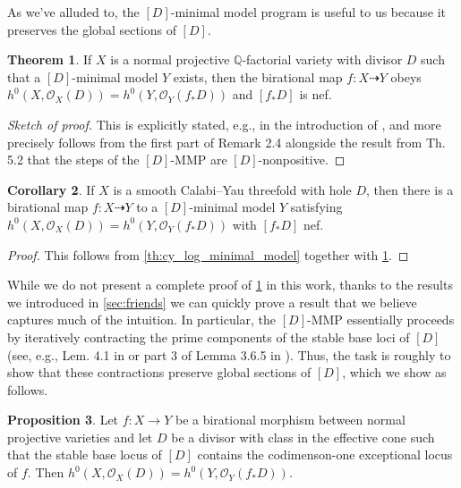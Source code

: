 \documentclass[11pt,dvipsnames]{article}
\theoremstyle{definition}
\newtheorem{theorem}{Theorem}
\newtheorem{prop}[theorem]{Proposition}
\newtheorem{corollary}[theorem]{Corollary}
\begin{document}
As we've alluded to, the $[D]$-minimal model program is useful to us because it preserves the global sections of $[D]$.
\begin{theorem}
    \label{th:MMP_global_sections}
    If $X$ is a normal projective $\mathbb{Q}$-factorial variety with divisor $D$ such that a $[D]$-minimal model $Y$ exists, then the birational map $f : X \dashrightarrow Y$ obeys $h^0(X, \mathcal{O}_X(D)) = h^0(Y, \mathcal{O}_Y(f_* D))$ and $[f_* D]$ is nef.
\end{theorem}
\begin{proof}[Sketch of proof]
    This is explicitly stated, e.g., in the introduction of \cite{kaloghiros2016finite}, and more precisely follows from the first part of Remark 2.4 alongside the result from Th. 5.2 that the steps of the $[D]$-MMP are $[D]$-nonpositive.
\end{proof}
\begin{corollary}
    \label{th:CY_MMP_holes}
    If $X$ is a smooth Calabi--Yau threefold with hole $D$, then there is a birational map $f : X \dashrightarrow Y$ to a $[D]$-minimal model $Y$ satisfying $h^0(X, \mathcal{O}_X(D)) = h^0(Y, \mathcal{O}_Y(f_* D))$ with $[f_* D]$ nef.
\end{corollary}
\begin{proof}
    This follows from \cref{th:cy_log_minimal_model} together with \cref{th:MMP_global_sections}.
\end{proof}
While we do not present a complete proof of \cref{th:MMP_global_sections} in this work, thanks to the results we introduced in \cref{sec:friends} we can quickly prove a result that we believe captures much of the intuition. In particular, the $[D]$-MMP essentially proceeds by iteratively contracting the prime components of the stable base loci of $[D]$ (see, e.g., Lem. 4.1 in \cite{kaloghiros2016finite} or part 3 of Lemma 3.6.5 in \cite{birkar2010existence}). Thus, the task is roughly to show that these contractions preserve global sections of $[D]$, which we show as follows.
\begin{prop}
    Let $f : X \to Y$ be a birational morphism between normal projective varieties and let $D$ be a divisor with class in the effective cone such that the stable base locus of $[D]$ contains the codimenson-one exceptional locus of $f$. Then $h^0(X, \mathcal{O}_X(D)) = h^0(Y, \mathcal{O}_Y(f_* D))$.
    \label{prop:birational_preserve}
\end{prop}
\end{document}
